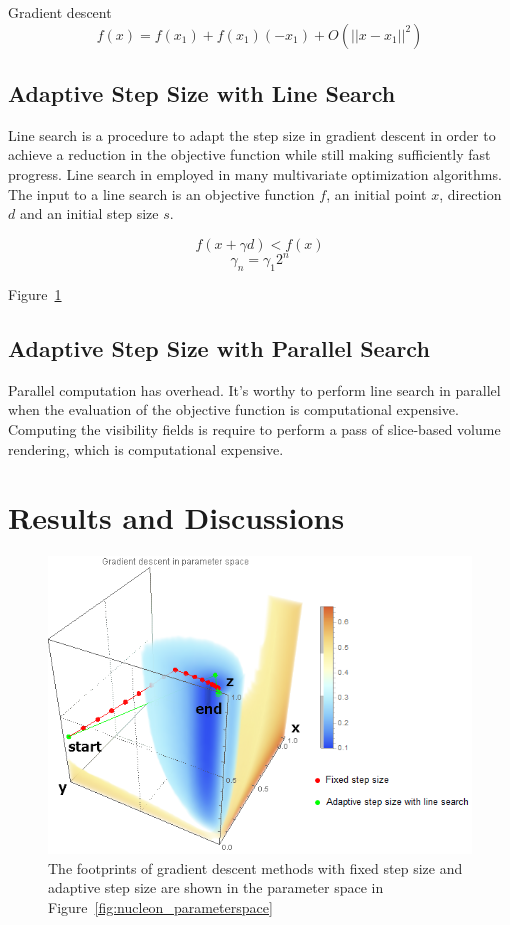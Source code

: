 Gradient descent
\[ f(x)=f(x_{1})+f(x_{1})(-x_{1})+O(||x-x_{1}||^{2}) \]

\subsection{Adaptive Step Size with Line Search}
Line search is a procedure to adapt the step size in gradient descent in order to achieve a reduction in the objective function while still making sufficiently fast progress. Line search in employed in many multivariate optimization algorithms.
The input to a line search is an objective function $ f $, an initial point $ x $, direction $ d $ and an initial step size $ s $.

\[ f(x+ \gamma d)<f(x) \]
\[ \gamma_{n}=\gamma_{1}2^{n} \]

Figure~\ref{fig:nucleon_parameterspace_path}

\subsection{Adaptive Step Size with Parallel Search}
Parallel computation has overhead.
It's worthy to perform line search in parallel when the evaluation of the objective function is computational expensive.
Computing the visibility fields is require to perform a pass of slice-based volume rendering, which is computational expensive.

\section{Results and Discussions}

\begin{figure}
	\centering
	\begin{minipage}{.9\textwidth}
		\includegraphics[width=1\linewidth]{images/parameterspace_path}
	\end{minipage}
	\caption{The footprints of gradient descent methods with fixed step size and adaptive step size are shown in the parameter space in Figure~\ref{fig:nucleon_parameterspace}}
	\label{fig:nucleon_parameterspace_path}
\end{figure}

